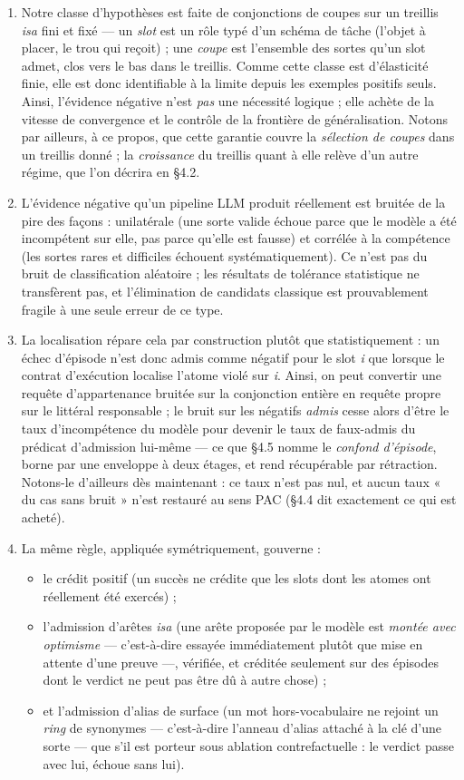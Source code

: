 \documentclass[11pt]{article}
\begin{document}
\begin{enumerate}
\item Notre classe d'hypothèses est faite de conjonctions de coupes sur un treillis \emph{isa} fini et fixé — un \emph{slot} est un rôle typé d'un schéma de tâche (l'objet à placer, le trou qui reçoit) ; une \emph{coupe} est l'ensemble des sortes qu'un slot admet, clos vers le bas dans le treillis. Comme cette classe est d'élasticité finie, elle est donc identifiable à la limite depuis les exemples positifs seuls. Ainsi, l'évidence négative n'est \emph{pas} une nécessité logique ; elle achète de la vitesse de convergence et le contrôle de la frontière de généralisation. Notons par ailleurs, à ce propos, que cette garantie couvre la \emph{sélection de coupes} dans un treillis donné ; la \emph{croissance} du treillis quant à elle relève d'un autre régime, que l'on décrira en §4.2.
\item L'évidence négative qu'un pipeline LLM produit réellement est bruitée de la pire des façons : unilatérale (une sorte valide échoue parce que le modèle a été incompétent sur elle, pas parce qu'elle est fausse) et corrélée à la compétence (les sortes rares et difficiles échouent systématiquement). Ce n'est pas du bruit de classification aléatoire ; les résultats de tolérance statistique ne transfèrent pas, et l'élimination de candidats classique est prouvablement fragile à une seule erreur de ce type.
\item La localisation répare cela par construction plutôt que statistiquement : un échec d'épisode n'est donc admis comme négatif pour le slot \emph{i} que lorsque le contrat d'exécution localise l'atome violé sur \emph{i}. Ainsi, on peut convertir une requête d'appartenance bruitée sur la conjonction entière en requête propre sur le littéral responsable ; le bruit sur les négatifs \emph{admis} cesse alors d'être le taux d'incompétence du modèle pour devenir le taux de faux-admis du prédicat d'admission lui-même — ce que §4.5 nomme le \emph{confond d'épisode}, borne par une enveloppe à deux étages, et rend récupérable par rétraction. Notons-le d'ailleurs dès maintenant : ce taux n'est pas nul, et aucun taux « du cas sans bruit » n'est restauré au sens PAC (§4.4 dit exactement ce qui est acheté).
\item La même règle, appliquée symétriquement, gouverne :
\begin{itemize}
\item le crédit positif (un succès ne crédite que les slots dont les atomes ont réellement été exercés) ;
\item l'admission d'arêtes \emph{isa} (une arête proposée par le modèle est \emph{montée avec optimisme} — c'est-à-dire essayée immédiatement plutôt que mise en attente d'une preuve —, vérifiée, et créditée seulement sur des épisodes dont le verdict ne peut pas être dû à autre chose) ;
\item et l'admission d'alias de surface (un mot hors-vocabulaire ne rejoint un \emph{ring} de synonymes — c'est-à-dire l'anneau d'alias attaché à la clé d'une sorte — que s'il est porteur sous ablation contrefactuelle : le verdict passe avec lui, échoue sans lui).

\end{itemize}
\end{enumerate}
\end{document}

